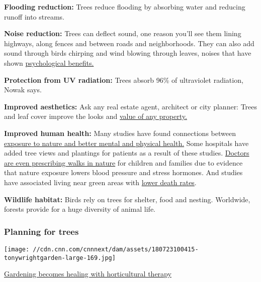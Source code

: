 \textbf{Flooding reduction:} Trees reduce flooding by absorbing water
and reducing runoff into streams.

\textbf{Noise reduction:} Trees can deflect sound, one reason you'll see
them lining highways, along fences and between roads and neighborhoods.
They can also add sound through birds chirping and wind blowing through
leaves, noises that have shown
\href{https://www.sciencedirect.com/science/article/abs/pii/S0272494413000650}{psychological
benefits.}

\textbf{Protection from UV radiation:} Trees absorb 96\% of ultraviolet
radiation, Nowak says.

\textbf{Improved aesthetics:} Ask any real estate agent, architect or
city planner: Trees and leaf cover improve the looks and
\href{https://www.sciencedirect.com/science/article/pii/S2212041614000394\#!}{value
of any property.}

\textbf{Improved human health:} Many studies have found connections
between
\href{https://www.uea.ac.uk/about/-/it-s-official-spending-time-outside-is-good-for-you}{exposure
to nature and better mental and physical health.} Some hospitals have
added tree views and plantings for patients as a result of these
studies.
\href{https://www.cnn.com/2018/10/05/health/nature-prescriptions-shetland-intl/index.html}{Doctors
are even prescribing walks in nature} for children and families due to
evidence that nature exposure lowers blood pressure and stress hormones.
And studies have associated living near green areas with
\href{https://www.cnn.com/2016/04/22/health/living-near-nature-linked-to-longer-lives/index.html}{lower
death rates}.

\textbf{Wildlife habitat:} Birds rely on trees for shelter, food and
nesting. Worldwide, forests provide for a huge diversity of animal life.

\hypertarget{planning-for-trees}{%
\subsubsection{Planning for trees}\label{planning-for-trees}}

\href{/2018/08/03/health/sw-horticultural-therapy/index.html}{}

\texttt{[image: //cdn.cnn.com/cnnnext/dam/assets/180723100415-tonywrightgarden-large-169.jpg]}

\href{/2018/08/03/health/sw-horticultural-therapy/index.html}{Gardening
becomes healing with horticultural therapy}

